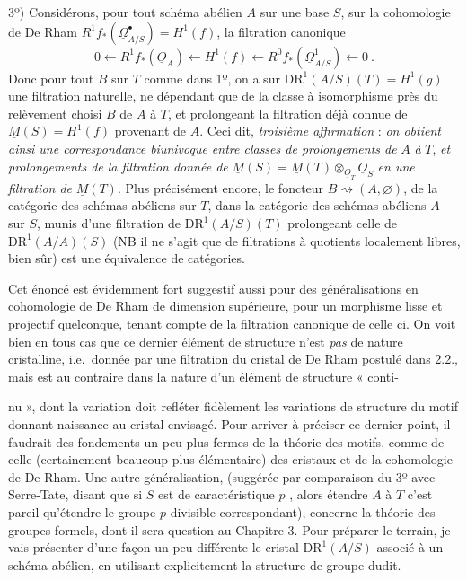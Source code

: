\documentclass[11pt,a4paper]{article}
\begin{document}
3º) Considérons, pour tout schéma abélien $A$ sur une base $S$, sur la
cohomologie de De Rham
$R^1f_*(\underline{\Omega}^{\bullet}_{A/S})=H^1(f)$, la filtration canonique
\[
  0\longleftarrow R^1f_*(\underline{O}_A)\longleftarrow H^1(f)\longleftarrow
  R^0f_*(\underline{\Omega}^1_{A/S})\longleftarrow 0\ .
\]
Donc pour tout $B$ sur $T$ comme dans 1º, on a sur
 $\mathrm{DR}^1(A/S)(T)=H^1(g)$ une filtration
naturelle, ne dépendant que de la classe à isomorphisme près du relèvement
choisi $B$ de $A$ à $T$, et prolongeant la filtration déjà connue de
 $\underline{M}(S)=H^1(f)$
provenant de $A$. Ceci dit, \emph{troisième affirmation} : \emph{on obtient
ainsi une correspondance biunivoque entre classes de prolongements de} $A$
\emph{à} $T$, \emph{et prolongements de la filtration donnée de}
$\underline{M}(S)=\underline{M}(T)\otimes_{\underline{O}_T}\underline{O}_S$
\emph{en une filtration de} $\underline{M}(T)$. Plus précisément encore, le
foncteur $B\rightsquigarrow(A,\varnothing)$, de la catégorie des schémas
abéliens  sur $T$, dans la catégorie des schémas abéliens
\struck{\ill{}} $A$ sur $S$, munis d'une filtration \add{$\varnothing$} de
$\mathrm{DR}^1(A/S)(T)$ prolongeant celle de
$\mathrm{DR}^1(A/A)(S)$ (NB il ne
s'agit que de filtrations à quotients localement libres, bien sûr) est une
équivalence de catégories.

Cet énoncé est
évidemment fort suggestif aussi pour des généralisations en cohomologie de De
Rham de dimension supérieure, pour un morphisme lisse et projectif quelconque,
tenant compte de la filtration canonique de celle ci. On voit bien en tous cas
que ce dernier élément de structure n'est \emph{pas} de nature cristalline,
i.e.\ donnée par une filtration du cristal de De Rham postulé dans 2.2., mais
est au contraire dans la nature d'un élément de structure « conti-

nu », dont la variation doit refléter fidèlement les variations de structure du
motif donnant naissance au cristal envisagé. Pour arriver à préciser ce dernier
point, il faudrait des fondements un peu plus fermes de la théorie des motifs,
comme de celle (certainement beaucoup plus élémentaire) des cristaux et de la
cohomologie de De Rham. Une autre généralisation, (suggérée par comparaison du
3º avec Serre-Tate, disant que si $S$ est de caractéristique $p$ ,
alors étendre $A$ à $T$\add{,} c'est pareil qu'étendre le groupe $p$-divisible
correspondant), concerne la théorie des groupes formels, dont il sera question
au Chapitre 3. Pour préparer le terrain, je vais présenter d'une façon un peu
différente le cristal $\mathrm{DR}^1(A/S)$ associé à un schéma abélien, en
utilisant explicitement la structure de groupe dudit.
\end{document}
